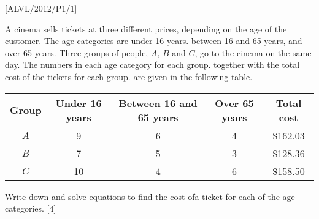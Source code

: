 \item {[}ALVL/2012/P1/1{]}

A cinema sells tickets at three different prices, depending on the
age of the customer. The age categories are under 16 years. between
16 and 65 years, and over 65 years. Three groups of people, $A$,
$B$ and $C$, go to the cinema on the same day. The numbers in each
age category for each group. together with the total cost of the tickets
for each group. are given in the following table. 
\noindent \begin{center}
\begin{tabular}{|c|c|c|c|c|}
\hline 
Group & Under 16 years & Between 16 and 65 years & Over 65 years & Total cost\tabularnewline
\hline 
$A$ & 9 & 6 & 4 & \$162.03\tabularnewline
\hline 
$B$ & 7 & 5 & 3 & \$128.36\tabularnewline
\hline 
$C$ & 10 & 4 & 6 & \$158.50\tabularnewline
\hline 
\end{tabular}
\par\end{center}

Write down and solve equations to find the cost ofa ticket for each
of the age categories. \hfill{}{[}4{]}
